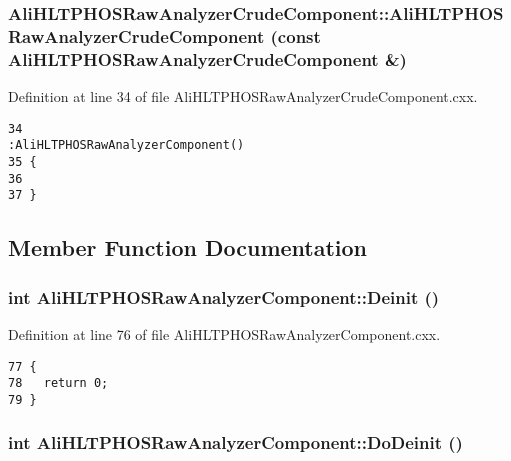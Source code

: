 \subsubsection{\setlength{\rightskip}{0pt plus 5cm}Ali\-HLTPHOSRaw\-Analyzer\-Crude\-Component::Ali\-HLTPHOSRaw\-Analyzer\-Crude\-Component (const {\bf Ali\-HLTPHOSRaw\-Analyzer\-Crude\-Component} \&)}\label{classAliHLTPHOSRawAnalyzerCrudeComponent_AliHLTPHOSRawAnalyzerCrudeComponenta2}




Definition at line 34 of file Ali\-HLTPHOSRaw\-Analyzer\-Crude\-Component.cxx.

\footnotesize\begin{verbatim}34                                                                                                                     :AliHLTPHOSRawAnalyzerComponent()
35 {
36 
37 }
\end{verbatim}\normalsize 




\subsection{Member Function Documentation}
\subsubsection{\setlength{\rightskip}{0pt plus 5cm}int Ali\-HLTPHOSRaw\-Analyzer\-Component::Deinit ()\hspace{0.3cm}{\tt  [virtual, inherited]}}\label{classAliHLTPHOSRawAnalyzerComponent_AliHLTPHOSRawAnalyzerPeakFinderComponenta5}




Definition at line 76 of file Ali\-HLTPHOSRaw\-Analyzer\-Component.cxx.

\footnotesize\begin{verbatim}77 {
78   return 0;
79 }
\end{verbatim}\normalsize 


\subsubsection{\setlength{\rightskip}{0pt plus 5cm}int Ali\-HLTPHOSRaw\-Analyzer\-Component::Do\-Deinit ()\hspace{0.3cm}{\tt  [virtual, inherited]}}\label{classAliHLTPHOSRawAnalyzerComponent_AliHLTPHOSRawAnalyzerPeakFinderComponenta6}




